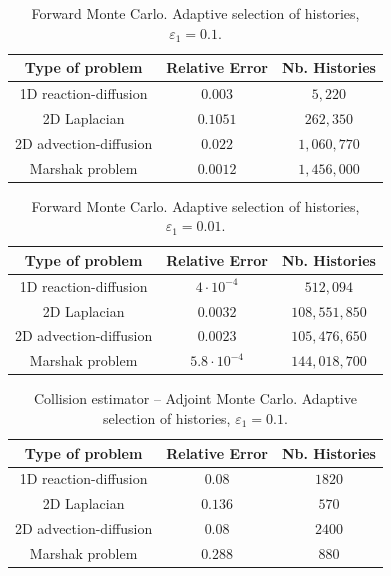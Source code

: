 \documentclass[times]{nlaauth}
\begin{document}
\begin{table}[!t]
\centering
\begin{tabular}{|c|c|c|}
\hline
\textbf{Type of problem} & \textbf{Relative Error} &\textbf{Nb. Histories}\\
\hline
1D reaction-diffusion & $0.003$ & $5,220$\\
\hline
2D Laplacian & $0.1051$ & $262,350$\\
\hline
2D advection-diffusion & $0.022$  & $1,060,770$\\
\hline
Marshak problem & $0.0012$ & $1,456,000$\\
\hline
\end{tabular}
\caption{Forward Monte Carlo. Adaptive selection of histories,
$\varepsilon_1=0.1$.}
\label{tab:For_adapt}
\end{table}

\begin{table}[!t]
\centering
\begin{tabular}{|c|c|c|}
\hline
\textbf{Type of problem} & \textbf{Relative Error} &\textbf{Nb. Histories}\\
\hline
1D reaction-diffusion & $4\cdot 10^{-4}$ & $512,094$\\
\hline
2D Laplacian & $0.0032$ & $108,551,850$\\
\hline
2D advection-diffusion & $0.0023$  & $105,476,650$\\
\hline
Marshak problem & $5.8 \cdot 10^{-4}$ & $144,018,700$\\
\hline
\end{tabular}
\caption{Forward Monte Carlo. Adaptive selection of histories,
$\varepsilon_1=0.01$.}
\label{tab:For_adapt2}
\end{table}


\begin{table}[!t]
\centering
\begin{tabular}{|c|c|c|}
\hline
\textbf{Type of problem} & \textbf{Relative Error} &\textbf{Nb. Histories}\\
\hline
1D reaction-diffusion & $0.08$ & $1820$\\
\hline
2D Laplacian & $0.136$ & $570$\\
\hline
2D advection-diffusion & $0.08$  & $2400$\\
\hline
Marshak problem & $0.288$ & $880$\\
\hline
\end{tabular}
\caption{Collision estimator -- Adjoint Monte Carlo. Adaptive selection of histories,
$\varepsilon_1=0.1$.}
\label{tab:Adj_adapt}
\end{table}
\end{document}
